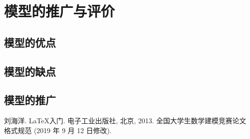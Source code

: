\documentclass[withoutpreface,bwprint]{cumcmthesis} %
\begin{document}
\section{模型的推广与评价}
\subsection{模型的优点}
\subsection{模型的缺点}
\subsection{模型的推广}

\begin{thebibliography}{9}%
    刘海洋.
    \newblock \LaTeX {}入门\allowbreak[J].
    \newblock 电子工业出版社, 北京, 2013.
    全国大学生数学建模竞赛论文格式规范 (2019 年 9 月 12 日修改).
\end{thebibliography}
\end{document}
